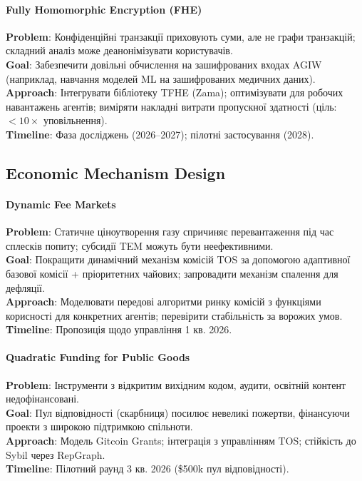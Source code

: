 \documentclass[11pt]{article}
\begin{document}
\paragraph{Fully Homomorphic Encryption (FHE)}
\textbf{Problem}: Конфіденційні транзакції приховують суми, але не графи транзакцій; складний аналіз може деанонімізувати користувачів.\\
\textbf{Goal}: Забезпечити довільні обчислення на зашифрованих входах AGIW (наприклад, навчання моделей ML на зашифрованих медичних даних).\\
\textbf{Approach}: Інтегрувати бібліотеку TFHE (Zama); оптимізувати для робочих навантажень агентів; виміряти накладні витрати пропускної здатності (ціль: $<10\times$ уповільнення).\\
\textbf{Timeline}: Фаза досліджень (2026--2027); пілотні застосування (2028).

\subsection{Economic Mechanism Design}

\paragraph{Dynamic Fee Markets}
\textbf{Problem}: Статичне ціноутворення газу спричиняє перевантаження під час сплесків попиту; субсидії TEM можуть бути неефективними.\\
\textbf{Goal}: Покращити динамічний механізм комісій TOS за допомогою адаптивної базової комісії + пріоритетних чайових; запровадити механізм спалення для дефляції.\\
\textbf{Approach}: Моделювати передові алгоритми ринку комісій з функціями корисності для конкретних агентів; перевірити стабільність за ворожих умов.\\
\textbf{Timeline}: Пропозиція щодо управління 1 кв. 2026.

\paragraph{Quadratic Funding for Public Goods}
\textbf{Problem}: Інструменти з відкритим вихідним кодом, аудити, освітній контент недофінансовані.\\
\textbf{Goal}: Пул відповідності (скарбниця) посилює невеликі пожертви, фінансуючи проекти з широкою підтримкою спільноти.\\
\textbf{Approach}: Модель Gitcoin Grants; інтеграція з управлінням TOS; стійкість до Sybil через RepGraph.\\
\textbf{Timeline}: Пілотний раунд 3 кв. 2026 (\$500k пул відповідності).
\end{document}

